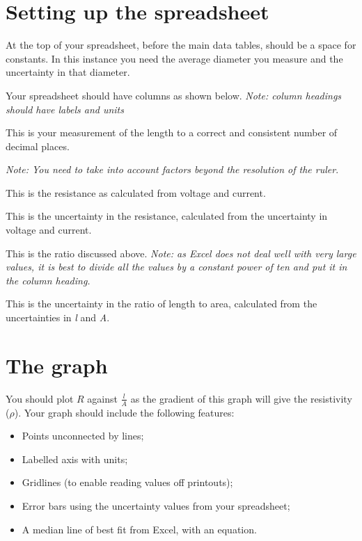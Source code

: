 \documentclass[11pt]{article}
\begin{document}
\begin{adjustwidth}{0cm}{0.4\textwidth}
\section{Setting up the spreadsheet}
At the top of your spreadsheet, before the main data tables, should be a space for constants.  In this instance you need the average diameter you measure and the uncertainty in that diameter.

Your spreadsheet should have columns as shown below.
\emph{Note: column headings should have labels and units}
\begin{description}
    \setlength{\itemsep}{10pt}
    \item[Length] This is your measurement of the length to a correct and consistent number of decimal places.
    \item[Uncertainty in length] \emph{Note: You need to take into account factors beyond the resolution of the ruler}.
    \item[Voltage] 
    \item[Uncertainty in Voltage] 
    \item[Current] 
    \item[Uncertainty in current] 
    \item[Resistance] This is the resistance as calculated from voltage and current.
    \item[Uncertainty in resistance] This is the uncertainty in the resistance, calculated from the uncertainty in voltage and current.
    \item[\emph{l}/\emph{A}] This is the ratio discussed above.  \emph{Note: as Excel does not deal well with very large values, it is best to divide all the values by a constant power of ten and put it in the column heading.}
    \item[Uncertainty in \emph{l}/\emph{A}] This is the uncertainty in the ratio of length to area, calculated from the uncertainties in \emph{l} and \emph{A}.
\end{description}
\newpage

\section{The graph}

You should plot $R$ against $\frac{l}{A}$ as the gradient of this graph will give the resistivity ($\rho$).  Your graph should include the following features:
\begin{itemize}
    \item Points unconnected by lines;
    \item Labelled axis with units;
    \item Gridlines (to enable reading values off printouts);
    \item Error bars using the uncertainty values from your spreadsheet;
    \item A median line of best fit from Excel, with an equation.
\end{itemize}


\end{adjustwidth}
\end{document}
